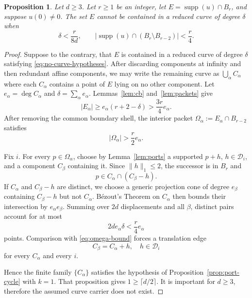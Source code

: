 \documentclass[11pt,reqno]{amsart}
\newcommand{\supp}{\operatorname{supp}}
\newtheorem{proposition}[theorem]{Proposition}
\theoremstyle{definition}
\theoremstyle{plain}
\numberwithin{equation}{section}
\begin{document}
\begin{proposition}\label{prop:nocurve}
Let $d\ge 3$. Let $r\ge1$ be an integer, let $E=\supp(u)\cap B_r$, and suppose
$u(0)\ne0$. The set $E$ cannot be contained in a reduced curve of degree
$\delta$ when
\begin{equation}\label{eq:no-curve-hypotheses}
 \delta<\frac r{8d},
 \qquad
 |\supp(u)\cap(B_r\setminus B_{r-2})|<\frac r4.
\end{equation}
\end{proposition}
\begin{proof}
    Suppose to the contrary, that $E$ is contained in a reduced curve of degree $\delta$ satisfying \eqref{eq:no-curve-hypotheses}. After discarding components at infinity and then redundant affine components, we may write the remaining curve as $\bigcup_\alpha C_\alpha$ where each $C_\alpha$ contains a point of $E$ lying on no other component. Let $e_\alpha=\deg C_\alpha$ and $\delta=\sum_{\alpha}e_\alpha$. Lemmas~\ref{lem:cb} and~\ref{lem:packets} give
    \begin{equation*}
        |E_\alpha|\ge e_\alpha (r+2-\delta)> \frac{3r}{4}e_\alpha.
    \end{equation*}
    After removing the common boundary shell, the interior packet $\Omega_\alpha:=E_\alpha\cap B_{r-2}$ satisfies
    \begin{equation}\label{eq:omega-bound}
        |\Omega_\alpha|>\frac{r}{2}e_\alpha.
    \end{equation}

    Fix $i$. For every $p\in \Omega_\alpha$, choose by Lemma~\ref{lem:ports} a supported $p+h$, $h\in \mathcal{D}_i$, and a component $C_\beta$ containing it. Since $\|h\|_1\le 2$, the successor is in $B_r$ and
    \begin{equation*}
        p\in C_\alpha\cap (C_\beta-h).
    \end{equation*}
    If $C_\alpha$ and $C_\beta-h$ are distinct, we choose a generic projection cone of degree $e_\beta$ containing $C_\beta-h$ but not $C_\alpha$. Bézout's Theorem \cite[Chapter~I, Theorem~7.7]{Hartshorne1977} on $C_\alpha$ then bounds their intersection by $e_\alpha e_\beta$. Summing over $2d$ displacements and all $\beta$, distinct pairs account for at most
    \begin{equation*}
        2d e_\alpha \delta<\frac{r}{4}e_\alpha
    \end{equation*}
    points. Comparison with \eqref{eq:omega-bound} forces a translation edge
    \begin{equation*}
        C_\beta=C_\alpha+h, \quad h\in \mathcal{D}_i
    \end{equation*}
    for every $C_\alpha$ and every $i$.

    Hence the finite family $\lbrace C_\alpha\rbrace$ satisfies the hypothesis of Proposition~\ref{prop:port-cycle} with $k=1$. That proposition gives $1\ge \lceil d/2\rceil$. It is important for $d\ge 3$, therefore the assumed curve carrier does not exist.
\end{proof}
\end{document}
